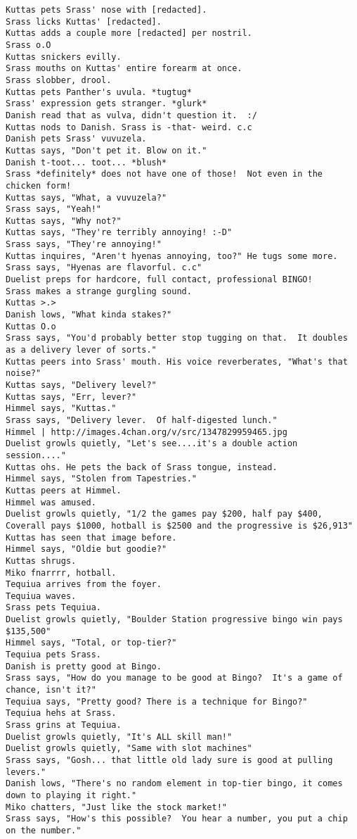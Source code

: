 \begin{verbatim}
Kuttas pets Srass' nose with [redacted].
Srass licks Kuttas' [redacted].
Kuttas adds a couple more [redacted] per nostril.
Srass o.O
Kuttas snickers evilly.
Srass mouths on Kuttas' entire forearm at once.
Srass slobber, drool.
Kuttas pets Panther's uvula. *tugtug*
Srass' expression gets stranger. *glurk*
Danish read that as vulva, didn't question it.  :/
Kuttas nods to Danish. Srass is -that- weird. c.c
Danish pets Srass' vuvuzela.
Kuttas says, "Don't pet it. Blow on it."
Danish t-toot... toot... *blush*
Srass *definitely* does not have one of those!  Not even in the chicken form!
Kuttas says, "What, a vuvuzela?"
Srass says, "Yeah!"
Kuttas says, "Why not?"
Kuttas says, "They're terribly annoying! :-D"
Srass says, "They're annoying!"
Kuttas inquires, "Aren't hyenas annoying, too?" He tugs some more.
Srass says, "Hyenas are flavorful. c.c"
Duelist preps for hardcore, full contact, professional BINGO!
Srass makes a strange gurgling sound.
Kuttas >.>
Danish lows, "What kinda stakes?"
Kuttas O.o
Srass says, "You'd probably better stop tugging on that.  It doubles as a delivery lever of sorts."
Kuttas peers into Srass' mouth. His voice reverberates, "What's that noise?"
Kuttas says, "Delivery level?"
Kuttas says, "Err, lever?"
Himmel says, "Kuttas."
Srass says, "Delivery lever.  Of half-digested lunch."
Himmel | http://images.4chan.org/v/src/1347829959465.jpg
Duelist growls quietly, "Let's see....it's a double action session...."
Kuttas ohs. He pets the back of Srass tongue, instead.
Himmel says, "Stolen from Tapestries."
Kuttas peers at Himmel.
Himmel was amused.
Duelist growls quietly, "1/2 the games pay $200, half pay $400, Coverall pays $1000, hotball is $2500 and the progressive is $26,913"
Kuttas has seen that image before.
Himmel says, "Oldie but goodie?"
Kuttas shrugs.
Miko fnarrrr, hotball.
Tequiua arrives from the foyer.
Tequiua waves.
Srass pets Tequiua.
Duelist growls quietly, "Boulder Station progressive bingo win pays $135,500"
Himmel says, "Total, or top-tier?"
Tequiua pets Srass.
Danish is pretty good at Bingo.
Srass says, "How do you manage to be good at Bingo?  It's a game of chance, isn't it?"
Tequiua says, "Pretty good? There is a technique for Bingo?"
Tequiua hehs at Srass.
Srass grins at Tequiua.
Duelist growls quietly, "It's ALL skill man!"
Duelist growls quietly, "Same with slot machines"
Srass says, "Gosh... that little old lady sure is good at pulling levers."
Danish lows, "There's no random element in top-tier bingo, it comes down to playing it right."
Miko chatters, "Just like the stock market!"
Srass says, "How's this possible?  You hear a number, you put a chip on the number."

\end{verbatim}
